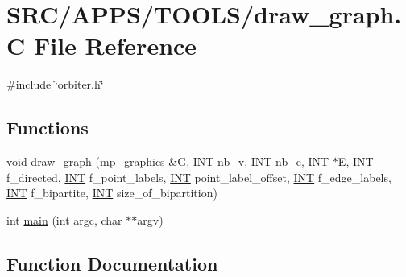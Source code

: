 \hypertarget{draw__graph_8_c}{}\section{S\+R\+C/\+A\+P\+P\+S/\+T\+O\+O\+L\+S/draw\+\_\+graph.C File Reference}
\label{draw__graph_8_c}
{\ttfamily \#include \char`\"{}orbiter.\+h\char`\"{}}\newline
\subsection*{Functions}
\begin{DoxyCompactItemize}
\item 
void \mbox{\hyperlink{draw__graph_8_c_ac3d5be41c23fc8281d4dbf048e0423bc}{draw\+\_\+graph}} (\mbox{\hyperlink{classmp__graphics}{mp\+\_\+graphics}} \&G, \mbox{\hyperlink{galois_8h_a09fddde158a3a20bd2dcadb609de11dc}{I\+NT}} nb\+\_\+v, \mbox{\hyperlink{galois_8h_a09fddde158a3a20bd2dcadb609de11dc}{I\+NT}} nb\+\_\+e, \mbox{\hyperlink{galois_8h_a09fddde158a3a20bd2dcadb609de11dc}{I\+NT}} $\ast$E, \mbox{\hyperlink{galois_8h_a09fddde158a3a20bd2dcadb609de11dc}{I\+NT}} f\+\_\+directed, \mbox{\hyperlink{galois_8h_a09fddde158a3a20bd2dcadb609de11dc}{I\+NT}} f\+\_\+point\+\_\+labels, \mbox{\hyperlink{galois_8h_a09fddde158a3a20bd2dcadb609de11dc}{I\+NT}} point\+\_\+label\+\_\+offset, \mbox{\hyperlink{galois_8h_a09fddde158a3a20bd2dcadb609de11dc}{I\+NT}} f\+\_\+edge\+\_\+labels, \mbox{\hyperlink{galois_8h_a09fddde158a3a20bd2dcadb609de11dc}{I\+NT}} f\+\_\+bipartite, \mbox{\hyperlink{galois_8h_a09fddde158a3a20bd2dcadb609de11dc}{I\+NT}} size\+\_\+of\+\_\+bipartition)
\item 
int \mbox{\hyperlink{draw__graph_8_c_a3c04138a5bfe5d72780bb7e82a18e627}{main}} (int argc, char $\ast$$\ast$argv)
\end{DoxyCompactItemize}


\subsection{Function Documentation}
\mbox{\label{draw__graph_8_c_ac3d5be41c23fc8281d4dbf048e0423bc}} 
